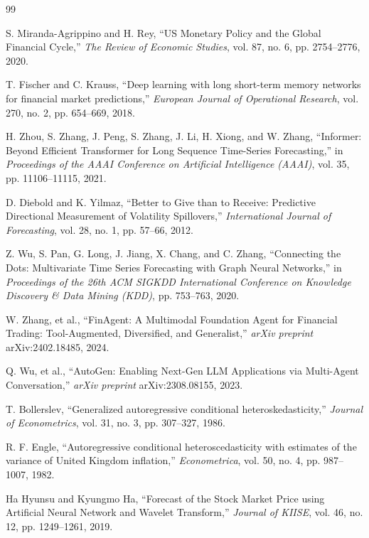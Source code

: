 \begin{thebibliography}{99}

S. Miranda-Agrippino and H. Rey,
``US Monetary Policy and the Global Financial Cycle,''
\emph{The Review of Economic Studies}, vol. 87, no. 6, pp. 2754--2776, 2020.

T. Fischer and C. Krauss,
``Deep learning with long short-term memory networks for financial market predictions,''
\emph{European Journal of Operational Research}, vol. 270, no. 2, pp. 654--669, 2018.

H. Zhou, S. Zhang, J. Peng, S. Zhang, J. Li, H. Xiong, and W. Zhang,
``Informer: Beyond Efficient Transformer for Long Sequence Time-Series Forecasting,''
in \emph{Proceedings of the AAAI Conference on Artificial Intelligence (AAAI)}, vol. 35, pp. 11106--11115, 2021.

D. Diebold and K. Yilmaz,
``Better to Give than to Receive: Predictive Directional Measurement of Volatility Spillovers,''
\emph{International Journal of Forecasting}, vol. 28, no. 1, pp. 57--66, 2012.

Z. Wu, S. Pan, G. Long, J. Jiang, X. Chang, and C. Zhang,
``Connecting the Dots: Multivariate Time Series Forecasting with Graph Neural Networks,''
in \emph{Proceedings of the 26th ACM SIGKDD International Conference on Knowledge Discovery \& Data Mining (KDD)},
pp. 753--763, 2020.

W. Zhang, et al.,
``FinAgent: A Multimodal Foundation Agent for Financial Trading: Tool-Augmented, Diversified, and Generalist,''
\emph{arXiv preprint} arXiv:2402.18485, 2024.

Q. Wu, et al.,
``AutoGen: Enabling Next-Gen LLM Applications via Multi-Agent Conversation,''
\emph{arXiv preprint} arXiv:2308.08155, 2023.

T. Bollerslev,
``Generalized autoregressive conditional heteroskedasticity,''
\emph{Journal of Econometrics}, vol. 31, no. 3, pp. 307--327, 1986.

R. F. Engle,
``Autoregressive conditional heteroscedasticity with estimates of the variance of United Kingdom inflation,''
\emph{Econometrica}, vol. 50, no. 4, pp. 987--1007, 1982.

Ha Hyunsu and Kyungmo Ha,
``Forecast of the Stock Market Price using Artificial Neural Network and Wavelet Transform,''
\emph{Journal of KIISE}, vol. 46, no. 12, pp. 1249--1261, 2019.


\end{thebibliography}
